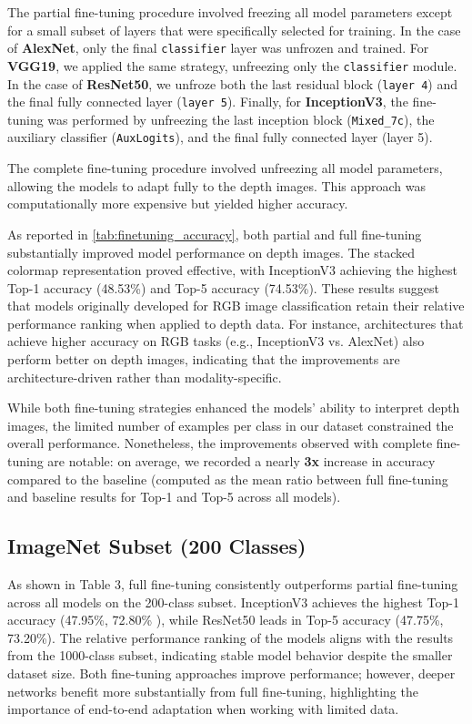 The partial fine-tuning procedure involved freezing all model parameters except for a small subset of layers that were specifically selected for training. In the case of \textbf{AlexNet}, only the final \texttt{classifier} layer was unfrozen and trained. For \textbf{VGG19}, we applied the same strategy, unfreezing only the \texttt{classifier} module. In the case of \textbf{ResNet50}, we unfroze both the last residual block (\texttt{layer 4}) and the final fully connected layer (\texttt{layer 5}). Finally, for \textbf{InceptionV3}, the fine-tuning was performed by unfreezing the last inception block (\texttt{Mixed\_7c}), the auxiliary classifier (\texttt{AuxLogits}), and the final fully connected layer (layer 5).

The complete fine-tuning procedure involved unfreezing all model parameters, allowing the models to adapt fully to the depth images. This approach was computationally more expensive but yielded higher accuracy.

As reported in \autoref{tab:finetuning_accuracy}, both partial and full fine-tuning substantially improved model performance on depth images. The stacked colormap representation proved effective, with InceptionV3 achieving the highest Top-1 accuracy (48.53\%) and Top-5 accuracy (74.53\%). These results suggest that models originally developed for RGB image classification retain their relative performance ranking when applied to depth data. For instance, architectures that achieve higher accuracy on RGB tasks (e.g., InceptionV3 vs. AlexNet) also perform better on depth images, indicating that the improvements are architecture-driven rather than modality-specific.

While both fine-tuning strategies enhanced the models' ability to interpret depth images, the limited number of examples per class in our dataset constrained the overall performance. Nonetheless, the improvements observed with complete fine-tuning are notable: on average, we recorded a nearly \textbf{3x} increase in accuracy compared to the baseline (computed as the mean ratio between full fine-tuning and baseline results for Top-1 and Top-5 across all models). 

\subsection{ImageNet Subset (200 Classes)}

As shown in Table 3, full fine-tuning consistently outperforms partial fine-tuning across all models on the 200-class subset. InceptionV3 achieves the highest Top-1 accuracy (47.95\%, 72.80\% ), while ResNet50 leads in Top-5 accuracy (47.75\%, 73.20\%). The relative performance ranking of the models aligns with the results from the 1000-class subset, indicating stable model behavior despite the smaller dataset size. Both fine-tuning approaches improve performance; however, deeper networks benefit more substantially from full fine-tuning, highlighting the importance of end-to-end adaptation when working with limited data.

